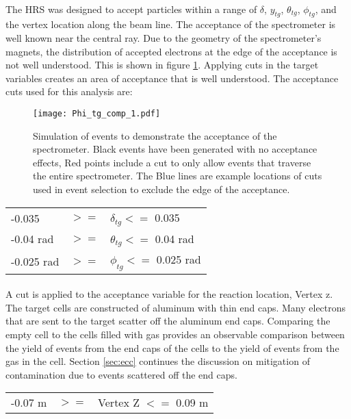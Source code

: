 \paragraph{} The HRS was designed to accept particles within a range of $\delta$, $y_{tg}$, $\theta_{tg}$, $\phi_{tg}$, and the vertex location along the beam line. The acceptance of the spectrometer is well known near the central ray. Due to the geometry of the spectrometer's magnets, the distribution of accepted electrons at the edge of the acceptance is not well understood. This is shown in figure \ref{phi_comp}. Applying cuts in the target variables creates an area of acceptance that is well understood. The acceptance cuts used for this analysis are:

\begin{figure}[t]
	\centering
	{\hspace*{-20pt}
	\texttt{[image: Phi\_tg\_comp\_1.pdf]}}
	\caption{Simulation of events to demonstrate the acceptance of the spectrometer. Black events have been generated with no acceptance effects, Red points include a cut to only allow events that traverse the entire spectrometer. The Blue lines are example locations of cuts used in event selection to exclude the edge of the acceptance. }
	\label{phi_comp}
\end{figure}

\begin{tabular}{@{$\bullet$ }lll}
-0.035 &$ >=$ &$\delta_{tg} <=$ 0.035\\
-0.04 rad &$>=$  &$\theta_{tg} <=$ 0.04 rad\\
-0.025 rad &$>=$  &$\phi_{tg}   <=$ 0.025 rad
\end{tabular}

\paragraph{}A cut is applied to the acceptance variable for the reaction location, Vertex z. The target cells are constructed of aluminum with thin end caps. Many electrons that are sent to the target scatter off the aluminum end caps. Comparing the empty cell to the cells filled with gas provides an observable comparison between the yield of events from the end caps of the cells to the yield of events from the gas in the cell. Section \ref{sec:ecc} continues the discussion on mitigation of contamination due to events scattered off the end caps.    

\begin{tabular}{@{$\bullet$ }lll}
  -0.07 m &$>=$& Vertex Z $<=$ 0.09 m
\end{tabular}

